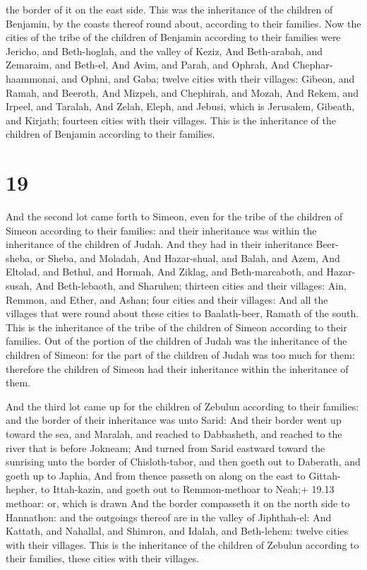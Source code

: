 the border of it on the east side. This was the inheritance of the
children of Benjamin, by the coasts thereof round about, according to
their families.  Now the cities of the tribe of the
children of Benjamin according to their families were Jericho, and
Beth-hoglah, and the valley of Keziz,  And Beth-arabah, and
Zemaraim, and Beth-el,  And Avim, and Parah, and Ophrah,
 And Chephar-haammonai, and Ophni, and Gaba; twelve cities
with their villages:  Gibeon, and Ramah, and Beeroth,
 And Mizpeh, and Chephirah, and Mozah,  And
Rekem, and Irpeel, and Taralah,  And Zelah, Eleph, and
Jebusi, which is Jerusalem, Gibeath, and Kirjath; fourteen cities with
their villages. This is the inheritance of the children of Benjamin
according to their families.

\hypertarget{section-18}{%
\section{19}\label{section-18}}

 And the second lot came forth to Simeon, even for the tribe
of the children of Simeon according to their families: and their
inheritance was within the inheritance of the children of Judah.
 And they had in their inheritance Beer-sheba, or Sheba, and
Moladah,  And Hazar-shual, and Balah, and Azem, 
And Eltolad, and Bethul, and Hormah,  And Ziklag, and
Beth-marcaboth, and Hazar-susah,  And Beth-lebaoth, and
Sharuhen; thirteen cities and their villages:  Ain, Remmon,
and Ether, and Ashan; four cities and their villages:  And
all the villages that were round about these cities to Baalath-beer,
Ramath of the south. This is the inheritance of the tribe of the
children of Simeon according to their families.  Out of the
portion of the children of Judah was the inheritance of the children of
Simeon: for the part of the children of Judah was too much for them:
therefore the children of Simeon had their inheritance within the
inheritance of them.

 And the third lot came up for the children of Zebulun
according to their families: and the border of their inheritance was
unto Sarid:  And their border went up toward the sea, and
Maralah, and reached to Dabbasheth, and reached to the river that is
before Jokneam;  And turned from Sarid eastward toward the
sunrising unto the border of Chisloth-tabor, and then goeth out to
Daberath, and goeth up to Japhia,  And from thence passeth
on along on the east to Gittah-hepher, to Ittah-kazin, and goeth out to
Remmon-methoar to Neah;+ 19.13 methoar: or, which is drawn 
And the border compasseth it on the north side to Hannathon: and the
outgoings thereof are in the valley of Jiphthah-el:  And
Kattath, and Nahallal, and Shimron, and Idalah, and Beth-lehem: twelve
cities with their villages.  This is the inheritance of the
children of Zebulun according to their families, these cities with their
villages.

